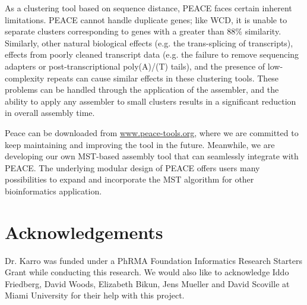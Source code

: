 \documentclass[a4,center,fleqn]{NAR}
\newcommand{\peace} {{\small PEACE}}
\newcommand{\wcd} {{\small WCD}}
\begin{document}
As a clustering tool based on sequence distance, \peace\/ faces
certain inherent limitations. \peace\/ cannot handle duplicate genes;
like \wcd\/, it is unable to separate clusters corresponding to genes
with a greater than 88\% similarity.  Similarly, other natural
biological effects (e.g. the trans-splicing of transcripts), effects
from poorly cleaned transcript data (e.g. the failure to remove
sequencing adapters or post-transcriptional poly(A)/(T) tails), and
the presence of low-complexity repeats can cause similar effects in
these clustering tools.  These problems can be handled through the
application of the assembler, and the ability to apply any assembler
to small clusters results in a significant reduction in overall
assembly time.

Peace can be downloaded from
\href{http://www.peace-tools.org}{www.peace-tools.org}, where we are
committed to keep maintaining and improving the tool in the future.
Meanwhile, we are developing our own MST-based assembly tool that can
seamlessly integrate with PEACE.  The underlying modular design of
PEACE offers users many possibilities to expand and incorporate the
MST algorithm for other bioinformatics application.

\section{Acknowledgements}

Dr. Karro was funded under a PhRMA Foundation Informatics Research
Starters Grant while conducting this research.  We would also like to
acknowledge Iddo Friedberg, David Woods, Elizabeth Bikun, Jens Mueller and David
Scoville at Miami University for their help with this project.

\vspace{3mm}


\end{document}
